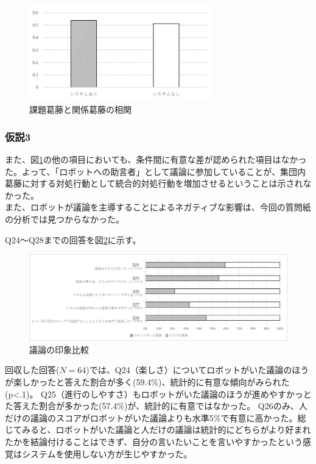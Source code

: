 \documentclass[11pt, a4paper]{jreport} %
\begin{document}
\begin{figure}[htbp]
\begin{center}
\includegraphics[width=80mm]{images/jikken3_kato.png}
\caption{課題葛藤と関係葛藤の相関}
\label{fig:jikken3_kato}
\end{center}
\end{figure}

\subsubsection*{仮説3}

また、図\ref{fig:jikken3_kato}の他の項目においても、条件間に有意な差が認められた項目はなかった。よって、「ロボットへの助言者」として議論に参加していることが、集団内葛藤に対する対処行動として統合的対処行動を増加させるということは示されなかった。\\


また、ロボットが議論を主導することによるネガティブな影響は、今回の質問紙の分析では見つからなかった。




Q24～Q28までの回答を図\ref{fig:jikken3_hikaku}に示す。


\begin{figure}[htbp]
\begin{center}
\includegraphics[width=150mm]{images/jikken3_hikaku.png}
\caption{議論の印象比較}
\label{fig:jikken3_hikaku}
\end{center}
\end{figure}

回収した回答($N=64$)では、Q24（楽しさ）についてロボットがいた議論のほうが楽しかったと答えた割合が多く(59.4\%)、統計的に有意な傾向がみられた(p<.1)。
Q25（進行のしやすさ）もロボットがいた議論のほうが進めやすかっとた答えた割合が多かった(57.4\%)が、統計的に有意ではなかった。
Q26のみ、人だけの議論のスコアがロボットがいた議論よりも水準5\%で有意に高かった。総じてみると、ロボットがいた議論と人だけの議論は統計的にどちらがより好まれたかを結論付けることはできず、自分の言いたいことを言いやすかったという感覚はシステムを使用しない方が生じやすかった。
\end{document}
